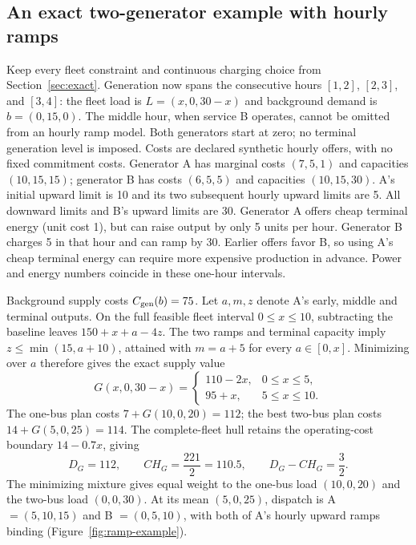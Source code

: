 \subsection{An exact two-generator example with hourly ramps}
Keep every fleet constraint and continuous charging choice from
Section~\ref{sec:exact}. Generation now spans the consecutive hours
$[1,2]$, $[2,3]$, and $[3,4]$: the fleet load is
$L=(x,0,30-x)$ and background demand is $b=(0,15,0)$. The middle hour,
when service B operates, cannot be omitted from an hourly ramp model.
Both generators start at zero; no terminal generation level is imposed.
Costs are declared synthetic hourly offers, with no fixed commitment costs.
Generator A has marginal costs $(7,5,1)$ and capacities $(10,15,15)$;
generator B has costs $(6,5,5)$ and capacities $(10,15,30)$.
A's initial upward limit is 10 and its two subsequent hourly upward limits
are 5. All downward limits and B's upward limits are 30. Generator A offers
cheap terminal energy (unit cost 1), but can raise output by only 5 units per
hour. Generator B charges 5 in that hour and can ramp by 30. Earlier offers
favor B, so using A's cheap terminal energy can require more expensive
production in advance. Power and energy numbers coincide in these one-hour
intervals.

Background supply costs $C_{\rm gen}(b)=75$. Let $a,m,z$ denote A's early, middle
and terminal outputs. On the full feasible fleet interval $0\le x\le10$,
subtracting the baseline leaves $150+x+a-4z$. The two ramps and terminal
capacity imply $z\le\min(15,a+10)$, attained with $m=a+5$ for every
$a\in[0,x]$. Minimizing over $a$ therefore gives the exact supply value
\begin{equation}\label{eq:ramp-value}
 G(x,0,30-x)=
 \begin{cases}110-2x,&0\le x\le5,\\95+x,&5\le x\le10.\end{cases}
\end{equation}
The one-bus plan costs $7+G(10,0,20)=112$; the best two-bus plan costs
$14+G(5,0,25)=114$. The complete-fleet hull retains the operating-cost
boundary $14-0.7x$, giving
\begin{equation}\label{eq:ramp-gap}
 D_G=112,\qquad CH_G=\frac{221}{2}=110.5,\qquad D_G-CH_G=\frac32.
\end{equation}
The minimizing mixture gives equal weight to the one-bus load $(10,0,20)$
and the two-bus load $(0,0,30)$. At its mean $(5,0,25)$, dispatch is
A $=(5,10,15)$ and B $=(0,5,10)$, with both of A's hourly upward ramps
binding (Figure~\ref{fig:ramp-example}).

